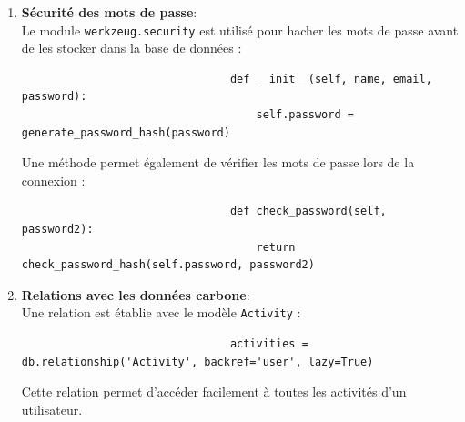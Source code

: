 \documentclass[a4paper,11pt]{article}
\begin{document}
                \begin{enumerate}
                    \item \textbf{Sécurité des mots de passe}:\\
                        \noindent Le module \texttt{werkzeug.security} est utilisé pour hacher les mots de passe avant de les stocker dans la base de données :
                        \begin{tcolorbox}[colback=lightgray!6, colframe=black, left=-45mm, right=5mm, top=2mm, bottom=0mm, boxrule=0.1mm]
                            \begin{verbatim}
                                def __init__(self, name, email, password):
                                    self.password = generate_password_hash(password)
                            \end{verbatim}
                        \end{tcolorbox}
                    
                        \noindent Une méthode permet également de vérifier les mots de passe lors de la connexion :
                        \begin{tcolorbox}[colback=lightgray!6, colframe=black, left=-45mm, right=5mm, top=2mm, bottom=0mm, boxrule=0.1mm]
                            \begin{verbatim}
                                def check_password(self, password2):
                                    return check_password_hash(self.password, password2)
                            \end{verbatim}
                        \end{tcolorbox}

                    \item \textbf{Relations avec les données carbone}:\\
                        \noindent Une relation est établie avec le modèle \texttt{Activity} :
                        \begin{tcolorbox}[colback=lightgray!6, colframe=black, left=-45mm, right=5mm, top=2mm, bottom=0mm, boxrule=0.1mm]
                            \begin{verbatim}
                                activities = db.relationship('Activity', backref='user', lazy=True)
                            \end{verbatim}
                        \end{tcolorbox}

                        \noindent Cette relation permet d'accéder facilement à toutes les activités d'un utilisateur.


\end{enumerate}
\end{document}
